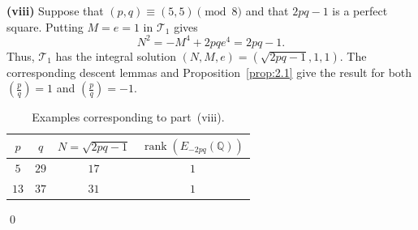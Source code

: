 \documentclass[12pt]{amsart}
\newcommand{\bbQ}{\mathbb{Q}}
\newcommand{\cT}{\mathcal{T}}
\newcommand{\legendre}[2]{\genfrac{(}{)}{}{}{#1}{#2}}
\numberwithin{equation}{section}
\theoremstyle{definition}
\begin{document}
\smallskip
\noindent\textbf{(viii)}
Suppose that $(p,q)\equiv(5,5)\pmod 8$ and that $2pq-1$ is a
perfect square. Putting $M=e=1$ in $\cT_1$ gives
\[
N^2=-M^4+2pqe^4=2pq-1.
\]
Thus, $\cT_1$ has the integral solution
$(N,M,e)=(\sqrt{2pq-1},1,1)$.
The corresponding descent lemmas and Proposition~\ref{prop:2.1}
give the result for both $\legendre{p}{q}=1$ and
$\legendre{p}{q}=-1$.

\begin{table}[!ht]
\centering
\scriptsize
\renewcommand{\arraystretch}{0.9}
\setlength{\tabcolsep}{5pt}
\begin{tabular}{cccc}
\hline
$p$&$q$&$N=\sqrt{2pq-1}$&
$\operatorname{rank}(E_{-2pq}(\bbQ))$\\
\hline
$5$ &$29$&$17$&$1$\\
$13$&$37$&$31$&$1$\\
\hline
\end{tabular}
\caption{Examples corresponding to part~\textup{(viii)}.}
\label{tab:11}
\end{table}
\qed 
\end{document}
